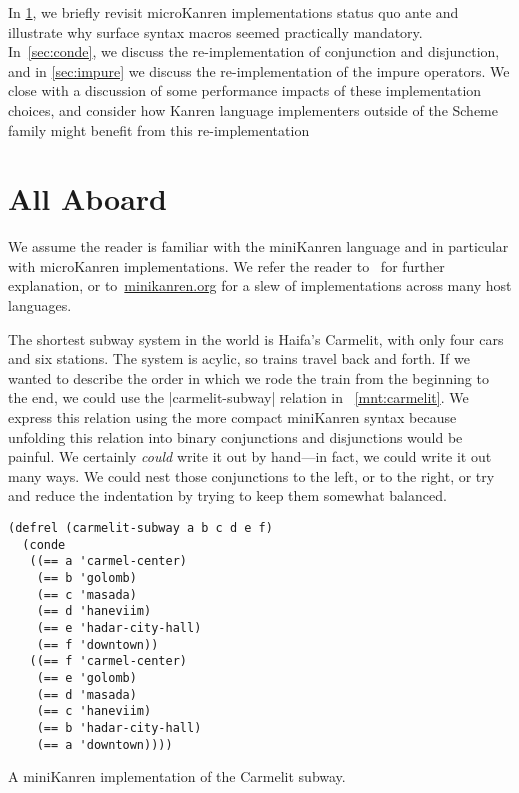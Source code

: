\documentclass[sigplan,screen,draft,anonymous,review,natbib=false]{acmart}
\begin{document}
In \cref{sec:all-aboard}, we briefly revisit microKanren implementations
status quo ante and illustrate why surface syntax macros seemed
practically mandatory. In~\cref{sec:conde}, we discuss the
re-implementation of conjunction and disjunction, and in
\cref{sec:impure} we discuss the re-implementation of the impure
operators. We close with a discussion of some performance impacts of
these implementation choices, and consider how Kanren language
implementers outside of the Scheme family might benefit from this
re-implementation

\section{All Aboard}\label{sec:all-aboard}

We assume the reader is familiar with the miniKanren language and in
particular with microKanren implementations. We refer the reader
to~\cite{friedman2018reasoned,hemann2013muKanren,hemann2016small} for
further explanation, or to~\href{minikanren.org}{minikanren.org} for a
slew of implementations across many host languages.

The shortest subway system in the world is Haifa's Carmelit, with only
four cars and six stations. The system is acylic, so trains travel
back and forth. If we wanted to describe the order in which we rode
the train from the beginning to the end, we could use the
\rackinline|carmelit-subway| relation in ~\cref{mnt:carmelit}. We
express this relation using the more compact miniKanren syntax because
unfolding this relation into binary conjunctions and disjunctions
would be painful. We certainly \emph{could} write it out by hand---in
fact, we could write it out many ways. We could nest those
conjunctions to the left, or to the right, or try and reduce the
indentation by trying to keep them somewhat balanced.

\begin{listing}
  \begin{verbatim}
(defrel (carmelit-subway a b c d e f)
  (conde
   ((== a 'carmel-center)
    (== b 'golomb)
    (== c 'masada)
    (== d 'haneviim)
    (== e 'hadar-city-hall)
    (== f 'downtown))
   ((== f 'carmel-center)
    (== e 'golomb)
    (== d 'masada)
    (== c 'haneviim)
    (== b 'hadar-city-hall)
    (== a 'downtown))))
  \end{verbatim}
  \caption{A miniKanren implementation of the Carmelit subway.}
  \label{mnt:carmelit}
\end{listing}
\end{document}
